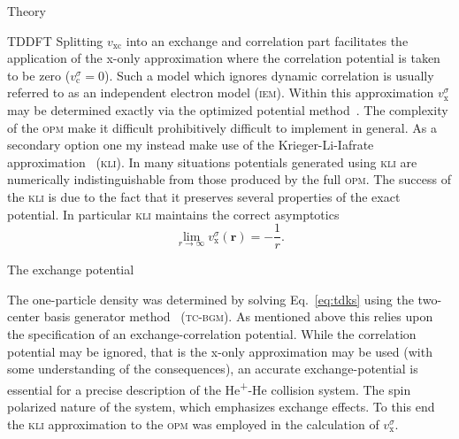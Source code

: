 \documentclass[aps, pra, reprint, groupedaddress, amsfonts,
               amsmath, amssymb, showpacs, nofootinbib]{revtex4-1}
\begin{document}
\begin{section}{Theory \label{sec:theory}}
\begin{subsection}{TDDFT \label{sec:tddft}}
      Splitting $v_\mathrm{xc}$ into an exchange and correlation part facilitates the application of the
      x-only approximation where the correlation potential is taken to be zero ($v^\sigma_\mathrm{c} =
      0$). Such a model which ignores dynamic correlation is usually referred to as an independent
      electron model (\textsc{iem}). Within this approximation $v^\sigma_\mathrm{x}$ may be determined
      exactly via the optimized potential method~\cite{opm1, opm2, tdopm}. The complexity of the
      \textsc{opm} make it difficult prohibitively difficult to implement in general. As a secondary
      option one my instead make use of the Krieger-Li-Iafrate approximation~\cite{klieq, tdkli1, tdkli2}
      (\textsc{kli}). In many situations potentials generated using \textsc{kli} are numerically
      indistinguishable from those produced by the full \textsc{opm}. The success of the \textsc{kli} is
      due to the fact that it preserves several properties of the exact potential. In particular
      \textsc{kli} maintains the correct asymptotics
      \begin{equation} \label{eq:asymp}
         \lim\limits_{r \rightarrow \infty} v_\mathrm{x}^\sigma (\mathbf{r}) = -\frac{1}{r}.
      \end{equation}
   
   \end{subsection}

   \begin{subsection}{The exchange potential \label{sec:xpot}}

      The one-particle density was determined by solving Eq.~\eqref{eq:tdks} using the two-center basis
      generator method~\cite{tcbgm} (\textsc{tc-bgm}). As mentioned above this relies upon the
      specification of an exchange-correlation potential. While the correlation potential may be
      ignored, that is the x-only approximation may be used (with some understanding of the
      consequences), an accurate exchange-potential is essential for a precise description of the
      He\textsuperscript{+}-He collision system. The spin polarized nature of the system, which
      emphasizes exchange effects. To this end the \textsc{kli} approximation to the \textsc{opm} was
      employed in the calculation of $v^\sigma_\mathrm{x}$.


\end{subsection}
\end{section}
\end{document}
